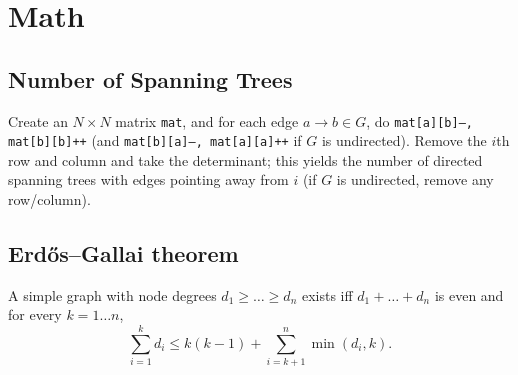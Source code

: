 \section{Math}
	\subsection{Number of Spanning Trees}
		Create an $N\times N$ matrix \texttt{mat}, and for each edge $a \rightarrow b \in G$, do
		\texttt{mat[a][b]--, mat[b][b]++} (and \texttt{mat[b][a]--, mat[a][a]++} if $G$ is undirected).
		Remove the $i$th row and column and take the determinant; this yields the number of directed spanning trees with edges pointing away from $i$
		(if $G$ is undirected, remove any row/column).

	\subsection{Erdős–Gallai theorem}
		A simple graph with node degrees $d_1 \ge \dots \ge d_n$ exists iff $d_1 + \dots + d_n$ is even and for every $k = 1\dots n$,
		\[ \sum _{i=1}^{k}d_{i}\leq k(k-1)+\sum _{i=k+1}^{n}\min(d_{i},k). \]
